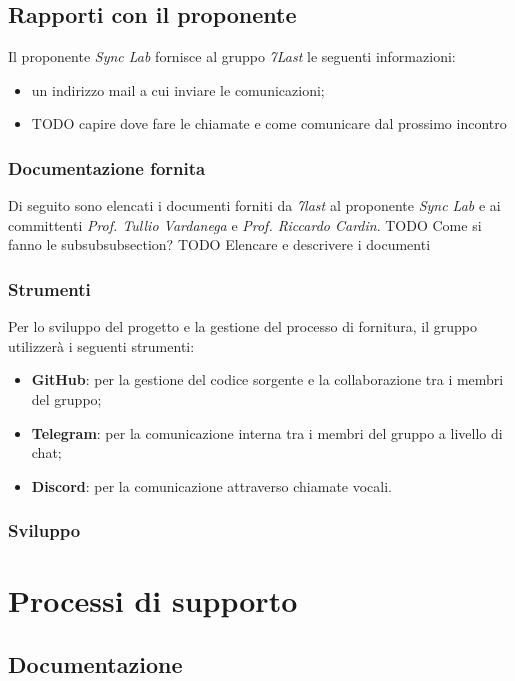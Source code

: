 \documentclass[italian,12pt]{article} %
\begin{document}
\subsection{Rapporti con il proponente}
Il proponente \textit{Sync Lab} fornisce al gruppo \textit{7Last} le seguenti informazioni:
\begin{itemize}
	\itemsep0em
	\item un indirizzo mail a cui inviare le comunicazioni;
	\item TODO capire dove fare le chiamate e come comunicare dal prossimo incontro
\end{itemize}

\subsubsection{Documentazione fornita}
Di seguito sono elencati i documenti forniti da \textit{7last} al proponente \textit{Sync Lab} e ai committenti \textit{Prof. Tullio Vardanega} e \textit{Prof. Riccardo Cardin}.
TODO Come si fanno le subsubsubsection?
TODO Elencare e descrivere i documenti

\subsubsection{Strumenti}
Per lo sviluppo del progetto e la gestione del processo di fornitura, il gruppo utilizzerà i seguenti strumenti:
\begin{itemize}
	\itemsep0em
	\item \textbf{GitHub}: per la gestione del codice sorgente e la collaborazione tra i membri del gruppo;
	\item \textbf{Telegram}: per la comunicazione interna tra i membri del gruppo a livello di chat;
	\item \textbf{Discord}: per la comunicazione attraverso chiamate vocali.
\end{itemize}

\subsubsection{Sviluppo}

\section{Processi di supporto}
\subsection{Documentazione}
\end{document}
